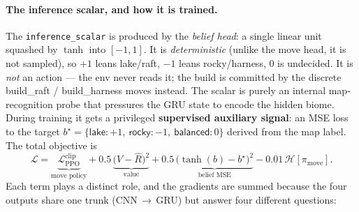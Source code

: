 \documentclass[11pt]{article}
\begin{document}
\paragraph{The inference scalar, and how it is trained.}
The \texttt{inference\_scalar} is produced by the \emph{belief head}: a single
linear unit squashed by $\tanh$ into $[-1,1]$. It is \emph{deterministic}
(unlike the move head, it is not sampled), so $+1$ leans lake/raft, $-1$ leans
rocky/harness, $0$ is undecided. It is \emph{not} an action --- the env never
reads it; the build is committed by the discrete \textsf{build\_raft} /
\textsf{build\_harness} moves instead. The scalar is purely an internal
map-recognition probe that pressures the GRU state to encode the hidden biome.
During training it gets a privileged
\textbf{supervised auxiliary signal}: an MSE loss to the target
$b^\star=\{\textsf{lake}:+1,\ \textsf{rocky}:-1,\ \textsf{balanced}:0\}$ derived
from the map label. The total objective is
\[
  \mathcal{L} = \underbrace{\mathcal{L}^{\text{clip}}_{\text{PPO}}}_{\text{move policy}}
              + 0.5\,\underbrace{\bigl(V-\hat R\bigr)^2}_{\text{value}}
              + 0.5\,\underbrace{\bigl(\tanh(b)-b^\star\bigr)^2}_{\text{belief MSE}}
              - 0.01\,\mathcal{H}[\pi_{\text{move}}].
\]
Each term plays a distinct role, and the gradients are summed because the
four outputs share one trunk (CNN\,$\to$\,GRU) but answer four different
questions:
\end{document}
